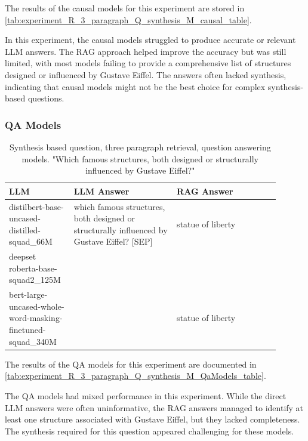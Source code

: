 \documentclass{wseas}
\begin{document}
The results of the causal models for this experiment
are stored in \autoref{tab:experiment_R_3_paragraph_Q_synthesis_M_causal_table}.

In this experiment, the causal models struggled to produce accurate or
relevant LLM answers. The RAG approach helped improve the accuracy but
was still limited, with most models failing to provide a comprehensive
list of structures designed or influenced by Gustave Eiffel. The answers
often lacked synthesis, indicating that causal models might not be the
best choice for complex synthesis-based questions.


\subsubsection{QA Models}

\begin{table}[htbp]
  \centering
  \caption{Synthesis based question, three paragraph retrieval, question answering models. "Which famous structures, both designed or structurally influenced by Gustave Eiffel?"} %
  \label{tab:experiment_R_3_paragraph_Q_synthesis_M_QaModels_table}  %
  \begin{tabular}{|p{0.20\linewidth}|p{0.35\linewidth}|p{0.35\linewidth}|}
    \hline
    \textbf{LLM} & \textbf{LLM Answer} & \textbf{RAG Answer} \\
    \hline
    distilbert-base-uncased-distilled-squad\_66M & which famous structures, both designed or structurally influenced by Gustave Eiffel? {[}SEP{]} & statue of liberty \\
    \hline
    deepset roberta-base-squad2\_125M & & \\
    \hline
    bert-large-uncased-whole-word-masking-finetuned-squad\_340M & & statue of liberty \\
    \hline
  \end{tabular}
\end{table}

The results of the QA models for this experiment
are documented in \autoref{tab:experiment_R_3_paragraph_Q_synthesis_M_QaModels_table}.

The QA models had mixed performance in this experiment. While the direct
LLM answers were often uninformative, the RAG answers managed to
identify at least one structure associated with Gustave Eiffel, but they
lacked completeness. The synthesis required for this question appeared
challenging for these models.
\end{document}
